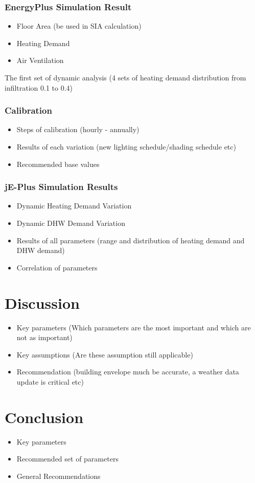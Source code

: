 \documentclass[11pt, a4paper]{article}
\theoremstyle{definition}
\begin{document}
		\subsubsection{EnergyPlus Simulation Result}		
		\begin{itemize}
			\item Floor Area (be used in SIA calculation)
			\item Heating Demand
			\item Air Ventilation
		\end{itemize}
		The first set of dynamic analysis (4 sets of heating demand distribution from infiltration 0.1 to 0.4)


		\subsubsection{Calibration}
			\begin{itemize}
				\item Steps of calibration (hourly - annually)
				\item Results of each variation (new lighting schedule/shading schedule etc)
				\item Recommended base values
			\end{itemize}
			
		\subsubsection{jE-Plus Simulation Results}
			\begin{itemize}
				\item Dynamic Heating Demand Variation
				\item Dynamic DHW Demand Variation
				\item Results of all parameters (range and distribution of heating demand and DHW demand)
				\item Correlation of parameters
			\end{itemize}



\section{Discussion}

		\begin{itemize}
		\item Key parameters (Which parameters are the most important and which are not as important)
		\item Key assumptions (Are these assumption still applicable)
		\item Recommendation (building envelope much be accurate, a weather data update is critical etc)
	\end{itemize}
			
\section{Conclusion}
	\begin{itemize}
		\item Key parameters
		\item Recommended set of parameters
		\item General Recommendations
	\end{itemize}



\printbibliography
\end{document}
